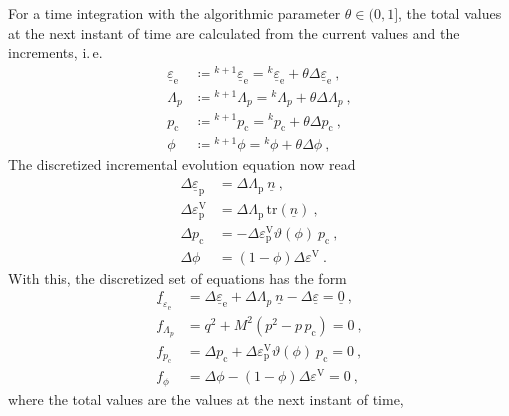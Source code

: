 \documentclass[paper=a4, twoside, pagesize]{scrartcl}
\newcommand{\tensor}[1]{\underline{#1}}
\renewcommand{\c}{\text{c}}
\newcommand{\e}{\text{e}}
\newcommand{\p}{\text{p}}
\newcommand{\trace}{\mathrm{tr}}
\begin{document}
For a time integration with the algorithmic parameter $\theta\in(0,1]$, the total values at the next instant of time are calculated from the current values and the increments, i.\,e. 
\begin{subequations}
\begin{align}
  \tensor\varepsilon_\e &\coloneqq {}^{k+1}\tensor\varepsilon_\e = {}^{k}\tensor\varepsilon_\e + \theta\varDelta \tensor\varepsilon_\e\ , \\
  \varLambda_p &\coloneqq {}^{k+1}\varLambda_p = {}^{k}\varLambda_p + \theta\varDelta \varLambda_p\ , \\
  p_\c &\coloneqq {}^{k+1}p_\c = {}^{k}p_\c + \theta\varDelta p_\c\ , \\
  \phi &\coloneqq {}^{k+1}\phi = {}^{k}\phi + \theta\varDelta\phi \ ,
\end{align}
\end{subequations}
The discretized incremental evolution equation now read
\begin{subequations}
\begin{align}
  \varDelta\tensor\varepsilon_\p &= \varDelta{\varLambda}_\p\ \tensor n\ , \\
  \varDelta{\varepsilon}_\p^\text{V} &= \varDelta{\varLambda}_\p\,\trace(\tensor n)\ , \\  
  \varDelta{p}_\c &= -\varDelta{\varepsilon}_\p^\text{V} \vartheta(\phi)\ p_\c\ , \\
  \varDelta\phi &= (1-\phi) \varDelta\varepsilon^\text{V} \ .
\end{align}
\end{subequations}
With this, the discretized set of equations has the form
\begin{subequations}\label{eq:incrementalSystem}
\begin{align}
  \tensor f_{\!\varepsilon_\e} &= \varDelta\tensor\varepsilon_\e + \varDelta\varLambda_p\ \tensor n - \varDelta\tensor\varepsilon = \tensor0 \ ,\\
  f_{\!\varLambda_p} &= q^2 + M^2(p^2 - p\,p_\c) = 0 \ , \label{eq:flp}\\ %
  f_{p_\c} &= \varDelta p_\c + \varDelta\varepsilon_\p^\text{V} \vartheta(\phi)\ p_\c = 0 \ , \label{eq:fpc} \\
  f_{\phi} &= \varDelta\phi - (1-\phi) \varDelta\varepsilon^\text{V} = 0 \ , \label{eq:fphi}
\end{align}
\end{subequations}
where the total values are the values at the next instant of time,
\end{document}

